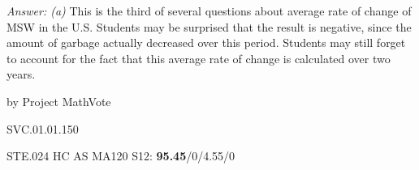 {\it Answer:  (a)}  This is the third of several questions about average rate of change of MSW in the U.S.  Students may be surprised that the result is negative, since the amount of garbage actually decreased over this period.  Students may still forget to account for the fact that this average rate of change is calculated over two years.

\medskip
by Project MathVote

SVC.01.01.150

STE.024
HC AS MA120 S12: {\bf 95.45}/0/4.55/0  \\
